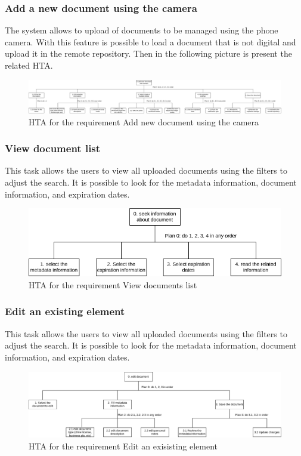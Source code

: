 \subsubsection{Add a new document using the camera}
The system allows to upload of documents to be managed using the phone camera. With this feature is possible to load a document that is not digital and upload it in the remote repository. Then in the following picture is present the related HTA.
\begin{figure}[H]
	\centering
	\includegraphics[width=\textwidth]{../Draw.io diagrams/add_new_document_camera.drawio.png}  %
	\caption{HTA for the requirement Add new document using the camera}
\end{figure}
\subsubsection{View document list}
This task allows the users to view all uploaded documents using the filters to adjust the search. It is possible to look for the metadata information, document information, and expiration dates.
\begin{figure}[H]
	\centering
	\includegraphics[width=\textwidth]{../Draw.io diagrams/search_and_view_documents.drawio.png}  %
	\caption{HTA for the requirement View documents list}
\end{figure}
\subsubsection{Edit an existing element}
This task allows the users to view all uploaded documents using the filters to adjust the search. It is possible to look for the metadata information, document information, and expiration dates.
\begin{figure}[H]
	\centering
	\includegraphics[width=\textwidth]{../Draw.io diagrams/edit_document.drawio.png}  %
	\caption{HTA for the requirement Edit an exisisting element}
\end{figure}
